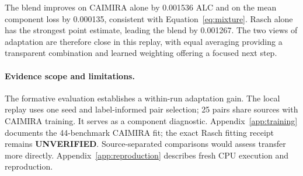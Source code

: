 The blend improves on CAIMIRA alone by 0.001536 ALC and on the mean component loss by 0.000135, consistent with Equation~\ref{eq:mixture}. Rasch alone has the strongest point estimate, leading the blend by 0.001267. The two views of adaptation are therefore close in this replay, with equal averaging providing a transparent combination and learned weighting offering a focused next step.

\paragraph{Evidence scope and limitations.}
The formative evaluation establishes a within-run adaptation gain. The local replay uses one seed and label-informed pair selection; 25 pairs share sources with CAIMIRA training. It serves as a component diagnostic. Appendix~\ref{app:training} documents the 44-benchmark CAIMIRA fit; the exact Rasch fitting receipt remains \textbf{UNVERIFIED}. Source-separated comparisons would assess transfer more directly. Appendix~\ref{app:reproduction} describes fresh CPU execution and reproduction.
